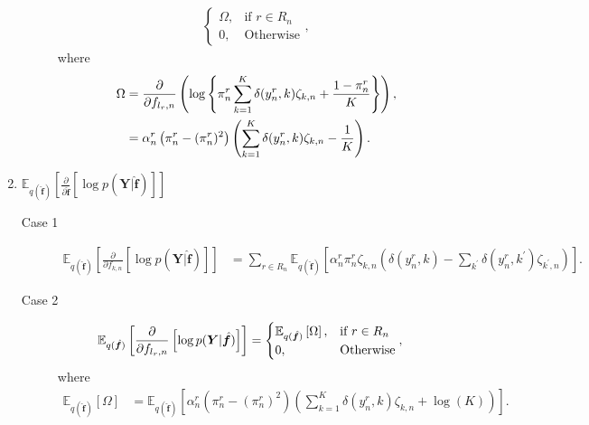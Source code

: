 \documentclass[9pt]{article}
\providecommand{\ve}[1]{{\bm{#1}}}%
\providecommand{\mat}[1]{{\bm{#1}}} %
\providecommand{\ve}[1]{{\mathbf{#1}}}
\providecommand{\mat}[1]{{\mathbf{#1}}}
\newcommand{\fracpartial}[2]{\frac{\partial #1}{\partial  #2}} %
\begin{document}
\begin{enumerate}
\begin{description}
\begin{align}
\begin{cases}
		\Omega, & \mbox{if $r\in R_n$}\\
		0, & \mbox{Otherwise}
		\end{cases},
		\end{align}
		where 
		\begin{align}
		\notag\Omega &= \fracpartial{}{f_{l_r,n}}\left(\log\left\{\pi_n^r\sum_{k=1}^{K}\delta(y_n^r,k)\zeta_{k,n} + \frac{1-\pi_n^r}{K}  \right\}\right),\\
		&= \alpha_n^r\left(\pi_n^r - (\pi_n^r)^2\right)\left(\sum_{k=1}^{K}\delta(y_n^r,k)\zeta_{k,n} - \frac{1}{K}\right).
		\end{align}
	\end{description}
	
	\item $\mathbb{E}_{q(\hat{\ve{f}})}\left[\fracpartial{}{\hat{\ve{f}}}\left[\log p(\mat{Y}|\hat{\ve{f}})\right]\right]$

	\begin{description}
		\item[Case 1] 
		\begin{align}
		 \mathbb{E}_{q(\hat{\ve{f}})}\left[\fracpartial{}{f_{k,n}}\left[\log p(\mat{Y}|\hat{\ve{f}})\right]\right] &= \sum_{r\in R_n}\mathbb{E}_{q(\hat{\ve{f}})}\left[\alpha_n^r\pi_n^r\zeta_{k,n}\left(\delta(y_n^r,k)-\sum_{k^{\prime}}\delta(y_n^r,k^{\prime})\zeta_{k^{\prime},n}\right)\right].
		 \label{eq:2}
		\end{align}
		\item[Case 2] 
		\begin{align}
		\notag \mathbb{E}_{q(\hat{\ve{f}})}\left[\fracpartial{}{f_{l_r,n}}\left[\log p(\mat{Y}|\hat{\ve{f}})\right]\right] &= \begin{cases}
		\mathbb{E}_{q(\hat{\ve{f}})}\left[\Omega\right], & \mbox{if $r\in R_n$}\\
		0, & \mbox{Otherwise}
		\end{cases},
		\end{align}
		where 
		\begin{align}
		\mathbb{E}_{q(\hat{\ve{f}})}\left[\Omega\right] &= \mathbb{E}_{q(\hat{\ve{f}})}\left[\alpha_n^r\left(\pi_n^r - (\pi_n^r)^2\right)\left(\sum_{k=1}^{K}\delta(y_n^r,k)\zeta_{k,n} + \log(K)\right)\right].
		\label{eq:3}
		\end{align}
	\end{description}
	

\end{enumerate}
\end{document}
